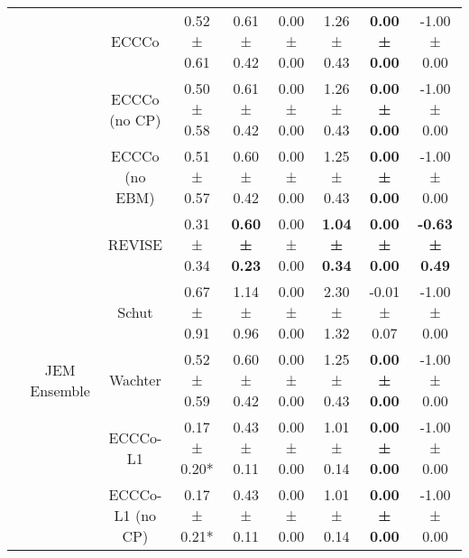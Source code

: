 \begin{longtable}[t]{ccccccccc}
 &  & ECCCo & 0.52 ± 0.61\hphantom{*}\hphantom{*} & 0.61 ± 0.42\hphantom{*}\hphantom{*} & 0.00 ± 0.00\hphantom{*}\hphantom{*} & 1.26 ± 0.43\hphantom{*}\hphantom{*} & \textbf{0.00 ± 0.00}\hphantom{*}\hphantom{*} & -1.00 ± 0.00\hphantom{*}\hphantom{*}\\

 &  & ECCCo (no CP) & 0.50 ± 0.58\hphantom{*}\hphantom{*} & 0.61 ± 0.42\hphantom{*}\hphantom{*} & 0.00 ± 0.00\hphantom{*}\hphantom{*} & 1.26 ± 0.43\hphantom{*}\hphantom{*} & \textbf{0.00 ± 0.00}\hphantom{*}\hphantom{*} & -1.00 ± 0.00\hphantom{*}\hphantom{*}\\

 &  & ECCCo (no EBM) & 0.51 ± 0.57\hphantom{*}\hphantom{*} & 0.60 ± 0.42\hphantom{*}\hphantom{*} & 0.00 ± 0.00\hphantom{*}\hphantom{*} & 1.25 ± 0.43\hphantom{*}\hphantom{*} & \textbf{0.00 ± 0.00}\hphantom{*}\hphantom{*} & -1.00 ± 0.00\hphantom{*}\hphantom{*}\\

 &  & REVISE & 0.31 ± 0.34\hphantom{*}\hphantom{*} & \textbf{0.60 ± 0.23}\hphantom{*}\hphantom{*} & 0.00 ± 0.00\hphantom{*}\hphantom{*} & \textbf{1.04 ± 0.34}\hphantom{*}\hphantom{*} & \textbf{0.00 ± 0.00}\hphantom{*}\hphantom{*} & \textbf{-0.63 ± 0.49}\hphantom{*}\hphantom{*}\\

 &  & Schut & 0.67 ± 0.91\hphantom{*}\hphantom{*} & 1.14 ± 0.96\hphantom{*}\hphantom{*} & 0.00 ± 0.00\hphantom{*}\hphantom{*} & 2.30 ± 1.32\hphantom{*}\hphantom{*} & -0.01 ± 0.07\hphantom{*}\hphantom{*} & -1.00 ± 0.00\hphantom{*}\hphantom{*}\\

 & \multirow[t]{-9}{*}{\centering\arraybackslash JEM Ensemble} & Wachter & 0.52 ± 0.59\hphantom{*}\hphantom{*} & 0.60 ± 0.42\hphantom{*}\hphantom{*} & 0.00 ± 0.00\hphantom{*}\hphantom{*} & 1.25 ± 0.43\hphantom{*}\hphantom{*} & \textbf{0.00 ± 0.00}\hphantom{*}\hphantom{*} & -1.00 ± 0.00\hphantom{*}\hphantom{*}\\
\cmidrule{2-9}
 &  & ECCCo-L1 & 0.17 ± 0.20*\hphantom{*} & 0.43 ± 0.11\hphantom{*}\hphantom{*} & 0.00 ± 0.00\hphantom{*}\hphantom{*} & 1.01 ± 0.14\hphantom{*}\hphantom{*} & \textbf{0.00 ± 0.00}\hphantom{*}\hphantom{*} & -1.00 ± 0.00\hphantom{*}\hphantom{*}\\

 &  & ECCCo-L1 (no CP) & 0.17 ± 0.21*\hphantom{*} & 0.43 ± 0.11\hphantom{*}\hphantom{*} & 0.00 ± 0.00\hphantom{*}\hphantom{*} & 1.01 ± 0.14\hphantom{*}\hphantom{*} & \textbf{0.00 ± 0.00}\hphantom{*}\hphantom{*} & -1.00 ± 0.00\hphantom{*}\hphantom{*}\\


\end{longtable}
